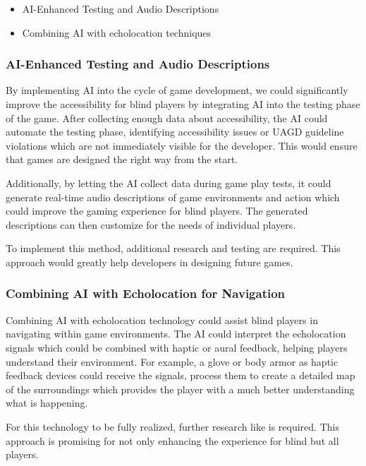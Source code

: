 \documentclass[sigconf,natbib=false,10pt]{acmart}
\begin{document}
	\begin{itemize}
		\setlength\itemsep{0.5em}
		\item AI-Enhanced Testing and Audio Descriptions
		\item Combining AI with echolocation techniques
	\end{itemize}

	\subsubsection{AI-Enhanced Testing and Audio Descriptions}
	By implementing AI into the cycle of game development, we could significantly improve the accessibility for blind players by integrating AI into the testing phase of the game.
	After collecting enough data about accessibility, the AI could automate the testing phase, identifying accessibility issues or UAGD guideline violations which are not immediately visible for the developer.
	This would ensure that games are designed the right way from the start.
	
	Additionally, by letting the AI collect data during game play tests, it could generate real-time audio descriptions of game environments and action which could improve the gaming experience for blind players.
	The generated descriptions can then customize for the needs of individual players.
	
	To implement this method, additional research and testing are required.
	This approach would greatly help developers in designing future games.
	
	\subsubsection{Combining AI with Echolocation for Navigation}
	Combining AI with echolocation technology could assist blind players in navigating within game environments.
	The AI could interpret the echolocation signals which could be combined with haptic or aural feedback, helping players understand their environment.
	For example, a glove or body armor as haptic feedback devices could receive the signals, process them to create a detailed map of the surroundings which provides the player with a much better understanding what is happening.
	
	For this technology to be fully realized, further research like \textcite{andrade_echo-house_2018} is required.
	This approach is promising for not only enhancing the experience for blind but all players.
	
\end{document}
